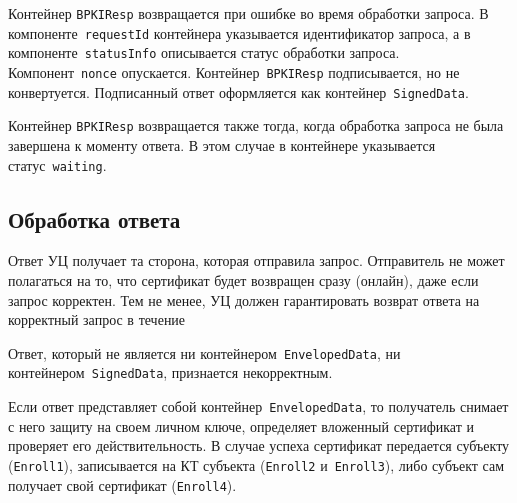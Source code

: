 Контейнер \texttt{BPKIResp} возвращается при ошибке во время обработки
запроса. В компоненте~\texttt{requestId} контейнера указывается идентификатор 
запроса, а в компоненте~\texttt{statusInfo} описывается статус обработки 
запроса. Компонент~\texttt{nonce} опускается.
%
Контейнер~\texttt{BPKIResp} подписывается, но не конвертуется.
%
Подписанный ответ оформляется как контейнер~\texttt{SignedData}.




Контейнер \texttt{BPKIResp} возвращается также тогда,
когда обработка запроса не была завершена к моменту ответа.
В этом случае в контейнере указывается статус~\texttt{waiting}.

\subsection{Обработка ответа}\label{PROCESSES.Enroll.Finish}

Ответ УЦ получает та сторона, которая отправила запрос.
Отправитель не может полагаться на то, что сертификат
будет возвращен сразу (онлайн), даже если запрос корректен.
%
Тем не менее, УЦ должен гарантировать возврат ответа на корректный запрос  
в течение  

Ответ, который не является ни контейнером~\texttt{EnvelopedData},
ни контейнером~\texttt{SignedData}, признается некорректным.

Если ответ представляет собой контейнер~\texttt{EnvelopedData}, 
то получатель снимает с него защиту на своем личном ключе, определяет 
вложенный сертификат и проверяет его действительность. 
%
В случае успеха сертификат передается субъекту (\texttt{Enroll1}),
записывается на КТ субъекта (\texttt{Enroll2} и~\texttt{Enroll3}),
либо субъект сам получает свой сертификат (\texttt{Enroll4}).


